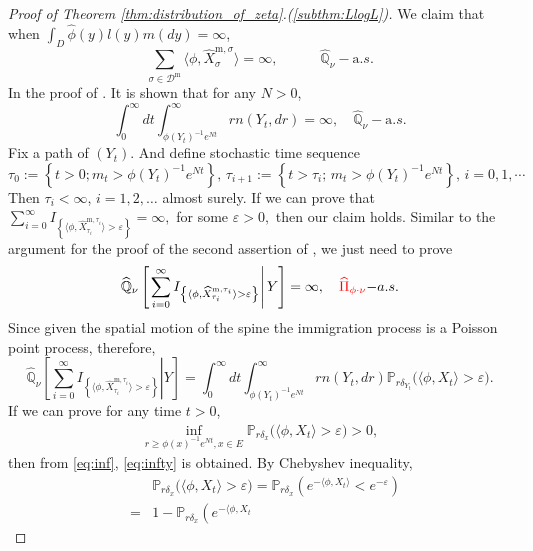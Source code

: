\documentclass[12pt,a4paper]{amsart}
\numberwithin{equation}{section}
\theoremstyle{plain}
\theoremstyle{definition}
\begin{document}
\begin{proof}[Proof of Theorem \ref{thm:distribution_of_zeta}.(\ref{subthm:LlogL})]
	We claim that when $\int_D\widehat\phi(y)l(y)m(dy)=\infty$,
  \begin{equation}\label{eq:infty}
    \sum_{\sigma\in \mathcal D^{\mathrm m}}\langle \phi, \widehat X_{\sigma}^{{\mathrm m},\sigma}\rangle =\infty,\quad\qquad  \widehat{\mathbb Q}_\nu-{\mathrm a.s.}
  \end{equation}
	In the proof of \cite[Lemma $3.2$]{LiuRenSong2009Log}.  It is shown that for any $N>0$,
  \begin{equation}\label{eq:inf}
    \int_0^\infty dt\int_{\phi(Y_t)^{-1}e^{Nt}}^\infty rn(Y_t,dr)
    =\infty,\quad \widehat{\mathbb Q}_\nu-{\mathrm a.s.}
  \end{equation}
	Fix a path of $(Y_t)$.  And define stochastic
	time sequence
  \[
    \tau_0:=\left\{t>0; m_t>\phi(Y_t)^{-1}e^{Nt}\right\},\,
    \tau_{i+1}:=\left\{t>\tau_i;\, m_t>\phi(Y_t)^{-1}e^{Nt}\right\},\, i=0,1,\cdots
  \]
	Then $\tau_i<\infty$, $i=1,2,\ldots$ almost surely.
	If we can prove that $\sum_{i=0}^\infty I_{\left\{\langle\phi, \widehat X^{{\mathrm m},\tau_i}_{\tau_i}\rangle  >\varepsilon\right\}}=\infty,$ for some $\varepsilon>0,$ then our claim holds.  Similar to the argument for the proof of the second assertion of \cite[Lemma $2.2$]{LiuRenSong2009Log}, we just need to prove
  \[
    \widehat{\mathbb Q}_\nu
    \left[\left.\sum_{i=0}^\infty I_{\left\{\langle\phi, \widehat X^{{\mathrm m},\tau_i}_{\tau_i}\rangle  >\varepsilon\right\}} \right| Y\right]=\infty,\quad {\color{red}\widehat\Pi_{\phi\cdot\nu}}{\mathrm -a.s.}
  \]
	Since given the spatial motion of the spine the immigration process is a Poisson point process, therefore,
  \[
    \widehat{\mathbb Q}_\nu\left[\left.\sum_{i=0}^\infty I_{\left\{\langle\phi, \widehat X^{{\mathrm m},\tau_i}_{\tau_i}\rangle  >\varepsilon\right\}}\right| Y\right]=\int_0^\infty dt\int_{\phi(Y_t)^{-1}e^{Nt}}^\infty rn(Y_t, dr)\mathbb{P}_{r\delta_{Y_t}}\big(\langle\phi, X_t \rangle >\varepsilon\big).
  \]
	If we can prove for any time $t>0$,
  \begin{eqnarray}\label{eq:last_point}
    \inf_{r\geq \phi(x)^{-1}e^{Nt}, x\in E}\mathbb P_{r\delta_x}\big(\langle\phi, X_t
    \rangle >\varepsilon\big)>0,
  \end{eqnarray}
	then from \eqref{eq:inf}, \eqref{eq:infty} is obtained.  By Chebyshev inequality,
  \begin{eqnarray*}
    &&\mathbb P_{r\delta_x}\big(\langle\phi, X_t\rangle >\varepsilon\big)=\mathbb P_{r\delta_x}\left(e^{-\langle\phi, X_t\rangle }<e^{-\varepsilon}\right)\\
    &=&1-\mathbb P_{r\delta_x}\left(e^{-\langle\phi, X_t
}
\end{eqnarray*}
\end{proof}
\end{document}
